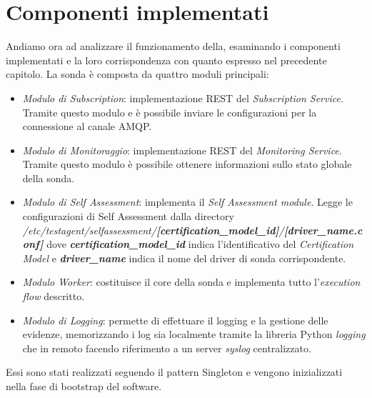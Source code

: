 \documentclass[../main.tex]{subfiles}
\begin{document}
\section{Componenti implementati}
Andiamo ora ad analizzare il funzionamento della, esaminando i componenti implementati e la loro corrispondenza con quanto espresso nel precedente capitolo.
La sonda è composta da quattro moduli principali:
\begin{itemize}
\item \textit{Modulo di \textit{Subscription}}: implementazione REST del \textit{Subscription Service}. Tramite questo modulo e è possibile inviare le configurazioni per la connessione al canale AMQP.
\item \textit{Modulo di Monitoraggio}: implementazione REST del \textit{Monitoring Service}. Tramite questo modulo è possibile ottenere informazioni sullo stato globale della sonda.
\item \textit{Modulo di Self Assessment}: implementa il \textit{Self Assessment module}. Legge le configurazioni di Self Assessment dalla directory
\textit{/etc/testagent/selfassessment/\textbf{[certification\_model\_id]}/\textbf{[driver\_name.conf]}} dove \textbf{\textit{certification\_model\_id}} indica l'identificativo del \textit{Certification Model} e \textbf{\textit{driver\_name}} indica il nome del driver di sonda corrispondente.
\item \textit{Modulo Worker}: costituisce il core della sonda e implementa tutto l'\textit{execution flow} descritto.
\item \textit{Modulo di Logging}: permette di effettuare il logging e la gestione delle evidenze, memorizzando i log sia localmente tramite la libreria Python \textit{logging} che in remoto facendo riferimento a un server \textit{syslog} centralizzato.
\end{itemize}
Essi sono stati realizzati seguendo il pattern Singleton e vengono inizializzati nella fase di bootstrap del software.
\end{document}

